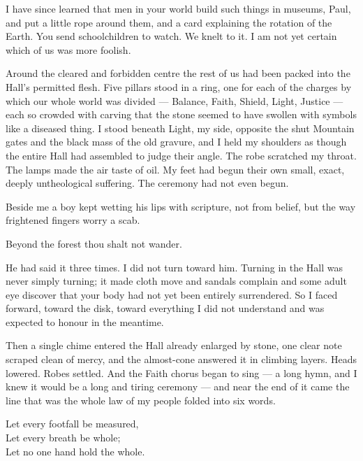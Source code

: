 I have since learned that men in your world build such things in museums, Paul, and put a little rope around them, and a card explaining the rotation of the Earth. You send schoolchildren to watch. We knelt to it. I am not yet certain which of us was more foolish.\par

Around the cleared and forbidden centre the rest of us had been packed into the Hall's permitted flesh. Five pillars stood in a ring, one for each of the charges by which our whole world was divided --- Balance, Faith, Shield, Light, Justice --- each so crowded with carving that the stone seemed to have swollen with symbols like a diseased thing. I stood beneath Light, my side, opposite the shut Mountain gates and the black mass of the old gravure, and I held my shoulders as though the entire Hall had assembled to judge their angle. The robe scratched my throat. The lamps made the air taste of oil. My feet had begun their own small, exact, deeply untheological suffering. The ceremony had not even begun.\par

Beside me a boy kept wetting his lips with scripture, not from belief, but the way frightened fingers worry a scab.\par

\begin{scripture}
Beyond the forest thou shalt not wander.
\end{scripture}

He had said it three times. I did not turn toward him. Turning in the Hall was never simply turning; it made cloth move and sandals complain and some adult eye discover that your body had not yet been entirely surrendered. So I faced forward, toward the disk, toward everything I did not understand and was expected to honour in the meantime.\par

Then a single chime entered the Hall already enlarged by stone, one clear note scraped clean of mercy, and the almost-cone answered it in climbing layers. Heads lowered. Robes settled. And the Faith chorus began to sing --- a long hymn, and I knew it would be a long and tiring ceremony --- and near the end of it came the line that was the whole law of my people folded into six words.\par

\begin{scripture}
Let every footfall be measured,\\
Let every breath be whole;\\
Let no one hand hold the whole.
\end{scripture}


